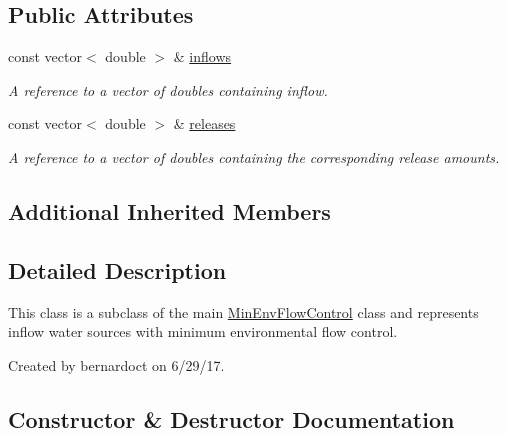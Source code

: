 \subsection*{Public Attributes}
\begin{DoxyCompactItemize}
\item 
const vector$<$ double $>$ \& \mbox{\hyperlink{classInflowMinEnvFlowControl_a669660259afa9313c77094dec815a52f}{inflows}}
\begin{DoxyCompactList}\small\item\em A reference to a vector of doubles containing inflow. \end{DoxyCompactList}\item 
const vector$<$ double $>$ \& \mbox{\hyperlink{classInflowMinEnvFlowControl_a2f82b53516516be63eb169d377df1f55}{releases}}
\begin{DoxyCompactList}\small\item\em A reference to a vector of doubles containing the corresponding release amounts. \end{DoxyCompactList}\end{DoxyCompactItemize}
\subsection*{Additional Inherited Members}


\subsection{Detailed Description}
This class is a subclass of the main {\ttfamily \mbox{\hyperlink{classMinEnvFlowControl}{Min\+Env\+Flow\+Control}}} class and represents inflow water sources with minimum environmental flow control. 

Created by bernardoct on 6/29/17. 

\subsection{Constructor \& Destructor Documentation}
\mbox{\label{classInflowMinEnvFlowControl_aff6c04aaa6e206b29b072aea6fb38367}} 
